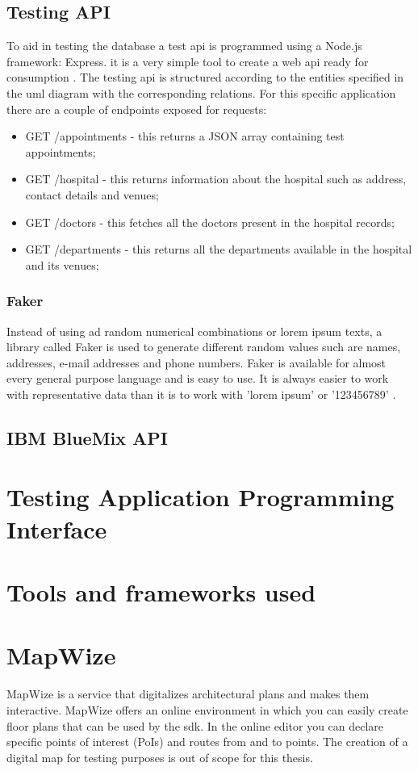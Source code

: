 \subsection{Testing API}
To aid in testing the database a test \acrshort{api} is programmed using a Node.js framework: Express. it is a very simple tool to create a web \acrshort{api} ready for consumption \cite{Express2019}. The testing \acrshort{api} is structured according to the entities specified in the \acrshort{uml} diagram with the corresponding relations. For this specific application there are a couple of endpoints exposed for requests:
\begin{itemize}
\item GET /appointments - this returns a JSON array containing test appointments;
\item GET /hospital - this returns information about the hospital such as address, contact details and venues;
\item GET /doctors - this fetches all the doctors present in the hospital records;
\item GET /departments - this returns all the departments available in the hospital and its venues;
\end{itemize}
\subsubsection{Faker}
Instead of using ad random numerical combinations or lorem ipsum texts, a library called Faker is used to generate different random values such are names, addresses, e-mail addresses and phone numbers. Faker is available for almost every general purpose language and is easy to use. It is always easier to work with representative data than it is to work with 'lorem ipsum' or '123456789' \cite{DanieleFaraglia2014}.
\subsection{IBM BlueMix API}

\section{Testing Application Programming Interface}
\section{Tools and frameworks used}
\section{MapWize}
MapWize is a service that digitalizes architectural plans and makes them interactive. MapWize offers an online environment in which you can easily create floor plans that can be used by the \acrshort{sdk}. In the online editor you can declare specific points of interest (PoIs) and routes from and to points. The creation of a digital map for testing purposes is out of scope for this thesis.
